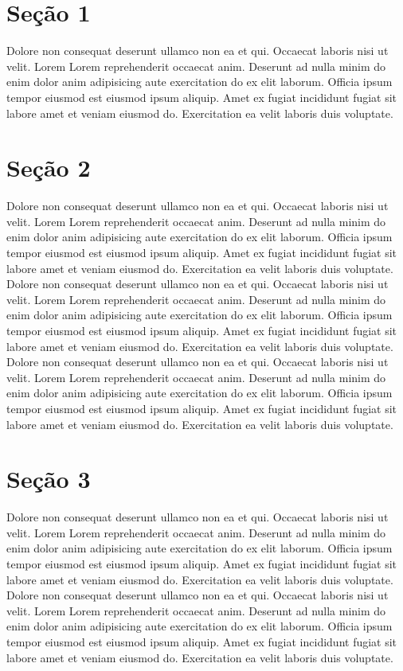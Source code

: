 \documentclass[12pt]{report}
\begin{document}

\twocolumn %

\section{Seção 1}

Dolore non consequat deserunt ullamco non ea et qui. Occaecat laboris nisi ut velit. Lorem Lorem reprehenderit occaecat anim. Deserunt ad nulla minim do enim dolor anim adipisicing aute exercitation do ex elit laborum. Officia ipsum tempor eiusmod est eiusmod ipsum aliquip. Amet ex fugiat incididunt fugiat sit labore amet et veniam eiusmod do. Exercitation ea velit laboris duis voluptate.

\section{Seção 2}

Dolore non consequat deserunt ullamco non ea et qui. Occaecat laboris nisi ut velit. Lorem Lorem reprehenderit occaecat anim. Deserunt ad nulla minim do enim dolor anim adipisicing aute exercitation do ex elit laborum. Officia ipsum tempor eiusmod est eiusmod ipsum aliquip. Amet ex fugiat incididunt fugiat sit labore amet et veniam eiusmod do. Exercitation ea velit laboris duis voluptate.
Dolore non consequat deserunt ullamco non ea et qui. Occaecat laboris nisi ut velit. Lorem Lorem reprehenderit occaecat anim. Deserunt ad nulla minim do enim dolor anim adipisicing aute exercitation do ex elit laborum. Officia ipsum tempor eiusmod est eiusmod ipsum aliquip. Amet ex fugiat incididunt fugiat sit labore amet et veniam eiusmod do. Exercitation ea velit laboris duis voluptate.
Dolore non consequat deserunt ullamco non ea et qui. Occaecat laboris nisi ut velit. Lorem Lorem reprehenderit occaecat anim. Deserunt ad nulla minim do enim dolor anim adipisicing aute exercitation do ex elit laborum. Officia ipsum tempor eiusmod est eiusmod ipsum aliquip. Amet ex fugiat incididunt fugiat sit labore amet et veniam eiusmod do. Exercitation ea velit laboris duis voluptate.

\section{Seção 3}

Dolore non consequat deserunt ullamco non ea et qui. Occaecat laboris nisi ut velit. Lorem Lorem reprehenderit occaecat anim. Deserunt ad nulla minim do enim dolor anim adipisicing aute exercitation do ex elit laborum. Officia ipsum tempor eiusmod est eiusmod ipsum aliquip. Amet ex fugiat incididunt fugiat sit labore amet et veniam eiusmod do. Exercitation ea velit laboris duis voluptate.
Dolore non consequat deserunt ullamco non ea et qui. Occaecat laboris nisi ut velit. Lorem Lorem reprehenderit occaecat anim. Deserunt ad nulla minim do enim dolor anim adipisicing aute exercitation do ex elit laborum. Officia ipsum tempor eiusmod est eiusmod ipsum aliquip. Amet ex fugiat incididunt fugiat sit labore amet et veniam eiusmod do. Exercitation ea velit laboris duis voluptate.
\end{document}
